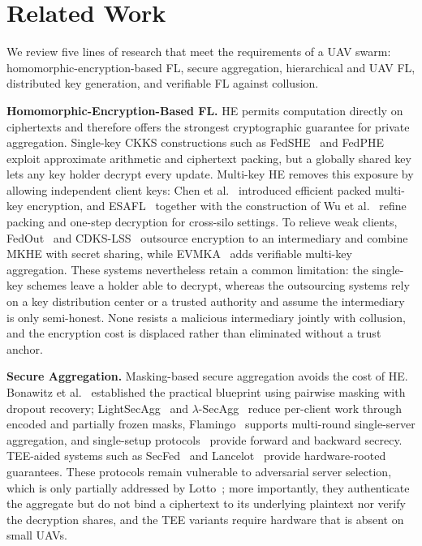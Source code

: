 \section{Related Work}
\label{sec:related}

We review five lines of research that meet the requirements of a UAV swarm: homomorphic-encryption-based FL, secure aggregation, hierarchical and UAV FL, distributed key generation, and verifiable FL against collusion.

\textbf{Homomorphic-Encryption-Based FL.} HE permits computation directly on ciphertexts and therefore offers the strongest cryptographic guarantee for private aggregation. Single-key CKKS constructions such as FedSHE~\cite{pan2024fedshe} and FedPHE~\cite{li2025fedphe} exploit approximate arithmetic and ciphertext packing, but a globally shared key lets any key holder decrypt every update. Multi-key HE removes this exposure by allowing independent client keys: Chen et al.~\cite{chen2019efficient} introduced efficient packed multi-key encryption, and ESAFL~\cite{wu2025esafl} together with the construction of Wu et al.~\cite{wu2025secure} refine packing and one-step decryption for cross-silo settings. To relieve weak clients, FedOut~\cite{yuan2026fedout} and CDKS-LSS~\cite{wang2026cdks} outsource encryption to an intermediary and combine MKHE with secret sharing, while EVMKA~\cite{yang2026evmka} adds verifiable multi-key aggregation. These systems nevertheless retain a common limitation: the single-key schemes leave a holder able to decrypt, whereas the outsourcing systems rely on a key distribution center or a trusted authority and assume the intermediary is only semi-honest. None resists a malicious intermediary jointly with collusion, and the encryption cost is displaced rather than eliminated without a trust anchor.

\textbf{Secure Aggregation.} Masking-based secure aggregation avoids the cost of HE. Bonawitz et al.~\cite{bonawitz2017practical} established the practical blueprint using pairwise masking with dropout recovery; LightSecAgg~\cite{so2022lightsecagg} and $\lambda$-SecAgg~\cite{ergun2025lambda} reduce per-client work through encoded and partially frozen masks, Flamingo~\cite{ma2023flamingo} supports multi-round single-server aggregation, and single-setup protocols~\cite{sultan2025single} provide forward and backward secrecy. TEE-aided systems such as SecFed~\cite{cai2023secfed} and Lancelot~\cite{jiang2024lancelot} provide hardware-rooted guarantees. These protocols remain vulnerable to adversarial server selection, which is only partially addressed by Lotto~\cite{jiang2024lotto}; more importantly, they authenticate the aggregate but do not bind a ciphertext to its underlying plaintext nor verify the decryption shares, and the TEE variants require hardware that is absent on small UAVs.

